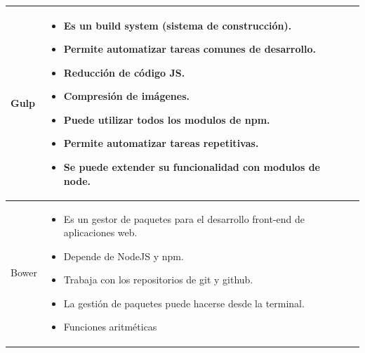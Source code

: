 \newpage
\begin{table}[b!]
	\centering
	\begin{tabular}{|p{2cm}|ll}
		\hline
		\multicolumn{1}{|p{5cm}|}{Gulp}  &   
		\multicolumn{1}{p{10cm}|}{
		\begin{itemize}
		\vspace{5mm}
		\item Es un build system (sistema de construcción).
		\item Permite automatizar tareas comunes de desarrollo.
		\item Reducción de código JS.
		\item Compresión de imágenes.
		\item Puede utilizar todos los modulos de npm.
		\item Permite automatizar tareas repetitivas.
		\item Se puede extender su funcionalidad con modulos de node.
		
		\end{itemize}} \\
		\hline
		\multicolumn{1}{|p{5cm}|}{Bower} &   
		\multicolumn{1}{p{10cm}|}{
		\begin{itemize}
		\vspace{10mm}
		\item Es un gestor de paquetes para el desarrollo front-end de aplicaciones web.
		\item Depende de NodeJS y npm.
		\item Trabaja con los repositorios de git y github.
		\item La gestión de paquetes puede hacerse desde la terminal.
		\item Funciones aritméticas
		\end{itemize}} \\
		\hline
	\end{tabular}
\end{table}

